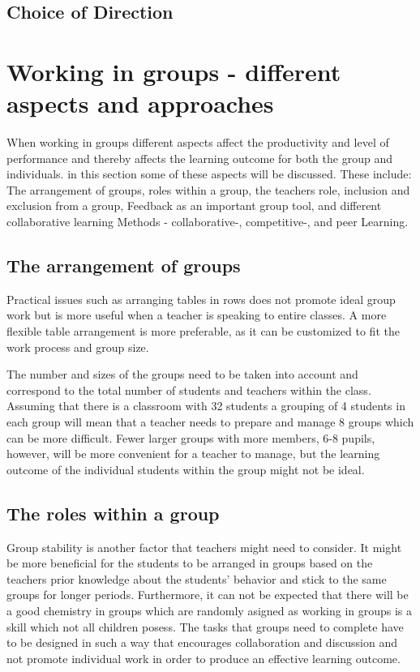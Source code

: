 \subsection{Choice of Direction} %





\section{Working in groups - different aspects and approaches} %

When working in groups different aspects affect the productivity and level of performance \cite{GodKlassekultur} and thereby affects the learning outcome for both the group and individuals. in this section some of these aspects will be discussed. These include: The arrangement of groups, roles within a group, the teachers role, inclusion and exclusion from a group, Feedback as an important group tool, and different collaborative learning Methods - collaborative-, competitive-, and peer Learning.

\subsection{The arrangement of groups}\label{GroupArrangement}
Practical issues such as arranging tables in rows does not promote ideal group work but is more useful when a teacher is speaking to entire classes. A more flexible table arrangement is more preferable, as it can be customized to fit the work process and group size. 

The number and sizes of the groups need to be taken into account and correspond to the total number of students and teachers within the class. Assuming that there is a classroom with 32 students a grouping of 4 students in each group will mean that a teacher needs to prepare and manage 8 groups which can be more difficult. Fewer larger groups with more members, 6-8 pupils, however, will be more convenient for a teacher to manage, but the learning outcome of the individual students within the group might not be ideal\cite{collaborationSocialPedagogy}.\\


\subsection{The roles within a group}
Group stability is another factor that teachers might need to consider. It might be more beneficial for the students to be arranged in groups based on the teachers prior knowledge about the students' behavior and stick to the same groups for longer periods\cite{collaborationSocialPedagogy}.
Furthermore, it can not be expected that there will be a good chemistry in groups which are randomly asigned as working in groups is a skill which not all children posess. The tasks that groups need to complete have to be designed in such a way that encourages collaboration and discussion and not promote individual work in order to produce an effective learning outcome\cite{collaborationSocialPedagogy}.

